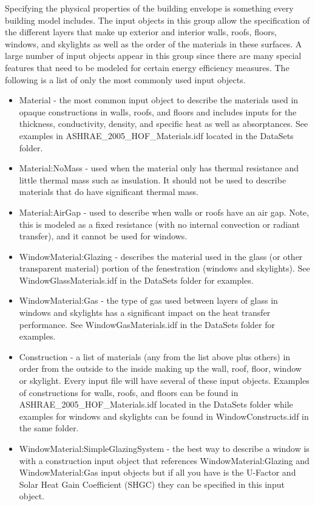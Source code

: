 Specifying the physical properties of the building envelope is something
every building model includes. The input objects in this group allow
the specification of the different layers that make up exterior and
interior walls, roofs, floors, windows, and skylights as well as the
order of the materials in these surfaces. A large number of input
objects appear in this group since there are many special features
that need to be modeled for certain energy efficiency measures. The
following is a list of only the most commonly used input objects.
\begin{itemize}
\item Material - the most common input object to describe the materials
used in opaque constructions in walls, roofs, and floors and includes
inputs for the thickness, conductivity, density, and specific heat
as well as absorptances. See examples in ASHRAE\_2005\_HOF\_Materials.idf
located in the DataSets folder.
\item Material:NoMass - used when the material only has thermal resistance
and little thermal mass such as insulation. It should not be used
to describe materials that do have significant thermal mass.
\item Material:AirGap - used to describe when walls or roofs have an air
gap. Note, this is modeled as a fixed resistance (with no internal
convection or radiant transfer), and it cannot be used for windows.
\item WindowMaterial:Glazing - describes the material used in the glass
(or other transparent material) portion of the fenestration (windows
and skylights). See WindowGlassMaterials.idf in the DataSets folder
for examples.
\item WindowMaterial:Gas - the type of gas used between layers of glass
in windows and skylights has a significant impact on the heat transfer
performance. See WindowGasMaterials.idf in the DataSets folder for
examples.
\item Construction - a list of materials (any from the list above plus others)
in order from the outside to the inside making up the wall, roof,
floor, window or skylight. Every input file will have several of these
input objects. Examples of constructions for walls, roofs, and floors
can be found in ASHRAE\_2005\_HOF\_Materials.idf located in the DataSets
folder while examples for windows and skylights can be found in WindowConstructs.idf
in the same folder.
\item WindowMaterial:SimpleGlazingSystem - the best way to describe a window
is with a construction input object that references WindowMaterial:Glazing
and WindowMaterial:Gas input objects but if all you have is the U-Factor
and Solar Heat Gain Coefficient (SHGC) they can be specified in this
input object.
\end{itemize}

